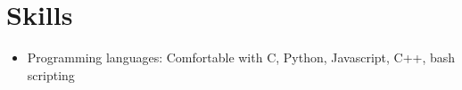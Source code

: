\documentclass[letterpaper,10pt]{article}
\begin{document}
\section*{Skills}
\vspace*{-0.2cm}
\begin{itemize}
\item Programming languages: Comfortable with C, Python, Javascript, C++, bash scripting

\end{itemize}

\end{document}
